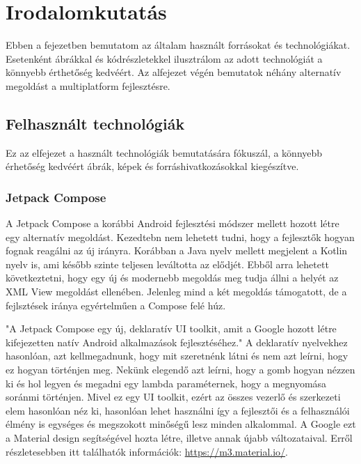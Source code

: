 \chapter{Irodalomkutatás}
\label{sec:Search}

Ebben a fejezetben bemutatom az általam használt forrásokat és technológiákat.
Esetenként ábrákkal és kódrészletekkel ilusztrálom az adott technológiát a könnyebb érthetőség kedvéért.
Az alfejezet végén bemutatok néhány alternatív megoldást a multiplatform fejlesztésre.

\section{Felhasznált technológiák}
\label{sec:Technologies}

Ez az elfejezet a használt technológiák bemutatására fókuszál, a könnyebb érhetőség kedvéért ábrák, képek és forráshivatkozásokkal kiegészítve. 

\subsection{Jetpack Compose}
\label{sec:JetpackCompose}

A Jetpack Compose a korábbi Android fejlesztési módszer mellett hozott létre egy alternatív megoldást.
Kezedtebn nem lehetett tudni, hogy a fejlesztők hogyan fognak reagálni az új irányra.
Korábban a Java nyelv mellett megjelent a Kotlin nyelv is, ami később szinte teljesen leváltotta az elődjét.
Ebből arra lehetett következtetni, hogy egy új és modernebb megoldás meg tudja állni a helyét az XML View megoldást ellenében.
Jelenleg mind a két megoldás támogatott, de a fejlsztések iránya egyértelműen a Compose felé húz.

"A Jetpack Compose egy új, deklaratív UI toolkit, amit a Google hozott létre kifejezetten natív Android alkalmazások fejlesztéséhez."\cite{GettingStartedWithJetpackCompose}
A deklaratív nyelvekhez hasonlóan, azt kellmegadnunk, hogy mit szeretnénk látni és nem azt leírni, hogy ez hogyan történjen meg.
Nekünk elegendő azt leírni, hogy a gomb hogyan nézzen ki és hol legyen és megadni egy lambda paraméternek, hogy a megnyomása soránmi történjen.
Mivel ez egy UI toolkit, ezért az összes vezerlő és szerkezeti elem hasonlóan néz ki, hasonlóan lehet használni így a fejlesztői és a felhasználói élmény is egységes és megszokott minőségű lesz minden alkalommal.
A Google ezt a Material design segítségével hozta létre, illetve annak újabb változataival. Erről részletesebben itt találhatók információk: \url{https://m3.material.io/}.


